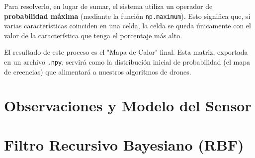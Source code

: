 Para resolverlo, en lugar de sumar, el sistema utiliza un operador de \textbf{probabilidad máxima} (mediante la función \texttt{np.maximum}). Esto significa que, si varias características coinciden en una celda, la celda se queda únicamente con el valor de la característica que tenga el porcentaje más alto. 

El resultado de este proceso es el "Mapa de Calor" final. Esta matriz, exportada en un archivo \texttt{.npy}, servirá como la distribución inicial de probabilidad (el mapa de creencias) que alimentará a nuestros algoritmos de drones.

\section{Observaciones y Modelo del Sensor}

\section{Filtro Recursivo Bayesiano (RBF)}
